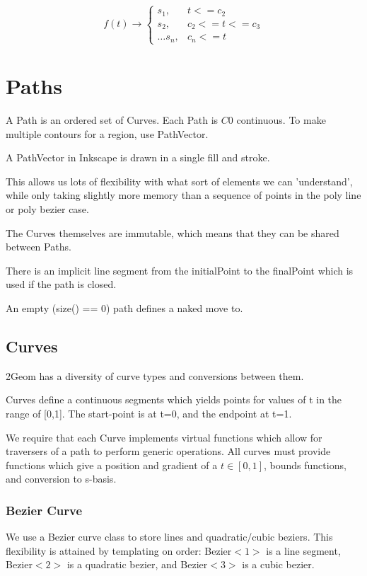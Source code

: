 \documentclass[openany]{book}
\newcommand{\code}[1]{\textsf{#1}}
\begin{document}
$$
f(t) \rightarrow \left\{ 
\begin{array}{cc}
s_1,& t <= c_2 \\
s_2,& c_2 <= t <= c_3\\
\ldots
s_n,& c_n <= t
\end{array}\right.
$$

\chapter{Paths}

A \code{Path} is an ordered set of \code{Curve}s.  Each \code{Path} is $C0$ continuous.  To make multiple contours for a region, use \code{PathVector}. 

A \code{PathVector} in Inkscape is drawn in a single fill and stroke.  

This allows us lots of flexibility with what sort of elements we can
'understand', while only taking slightly more memory than a sequence
of points in the poly line or poly bezier case. 

The Curves themselves are immutable, which means that they can be shared between Paths.

There is an implicit line segment from the initialPoint to the finalPoint which is used if the path is closed.

An empty (size() == 0) path defines a naked move to.

\section{Curves}
2Geom has a diversity of curve types and conversions between them.

Curves define a continuous segments which yields points for values of
t in the range of [0,1].  The start-point is at t=0, and the endpoint
at t=1.

We require that each \code{Curve} implements virtual functions which
allow for traversers of a path to perform generic operations.  All
curves must provide functions which give a position and gradient of a
$t \in [0,1]$, bounds functions, and conversion to s-basis.

\subsection{Bezier Curve}
We use a \code{Bezier} curve class to store lines and quadratic/cubic
beziers.  This flexibility is attained by templating on order:
\code{Bezier$<1>$} is a line segment, \code{Bezier$<2>$} is a quadratic
bezier, and \code{Bezier$<3>$} is a cubic bezier.
\end{document}
